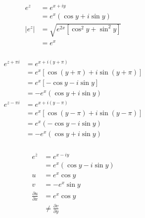 \documentclass{article}
\begin{document}
\setcounter{subsubsection}{16}
\subsubsection{}

\begin{align*}
  e^z   & = e^{x + i y}                          \\
        & = e^x (\cos y + i \sin y)              \\
  |e^z| & = \sqrt{e^{2 x} [\cos^2 y + \sin^2 y]} \\
        & = e^x
\end{align*}

\setcounter{subsubsection}{18}
\subsubsection{}

\begin{align*}
  e^{z + \pi i} & = e^{x + i (y + \pi)}                     \\
                & = e^x [\cos (y + \pi) + i \sin (y + \pi)] \\
                & = e^x [-\cos y - i \sin y]                \\
                & = -e^x (\cos y + i \sin y)                \\
  e^{z - \pi i} & = e^{x + i (y - \pi)}                     \\
                & = e^x [\cos (y - \pi) + i \sin (y - \pi)] \\
                & = e^x (-\cos y - i \sin y)                \\
                & = -e^x (\cos y + i \sin y)
\end{align*}

\setcounter{subsubsection}{20}
\subsubsection{}

\begin{align*}
  e^{\overline{z}}              & = e^{x - i y}                     \\
                                & = e^x (\cos y - i \sin y)         \\
  u                             & = e^x \cos y                      \\
  v                             & = -e^x \sin y                     \\
  \frac{\partial u}{\partial x} & = e^x \cos y                      \\
                                & \ne \frac{\partial v}{\partial y}
\end{align*}
\end{document}
